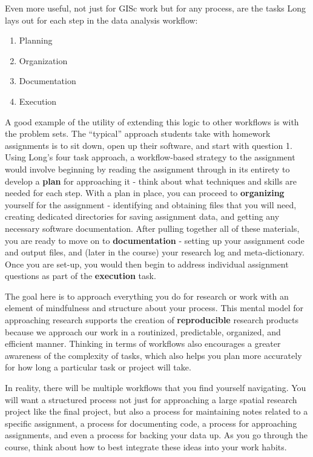 \documentclass[]{book}
\providecommand{\tightlist}{%
  \setlength{\itemsep}{0pt}\setlength{\parskip}{0pt}}
\theoremstyle{definition}
\theoremstyle{definition}
\theoremstyle{remark}
\begin{document}
Even more useful, not just for GISc work but for any process, are the
tasks Long lays out for each step in the data analysis workflow:

\begin{enumerate}
\def\labelenumi{\arabic{enumi}.}
\tightlist
\item
  Planning
\item
  Organization
\item
  Documentation
\item
  Execution
\end{enumerate}

A good example of the utility of extending this logic to other workflows
is with the problem sets. The ``typical'' approach students take with
homework assignments is to sit down, open up their software, and start
with question 1. Using Long's four task approach, a workflow-based
strategy to the assignment would involve beginning by reading the
assignment through in its entirety to develop a \textbf{plan} for
approaching it - think about what techniques and skills are needed for
each step. With a plan in place, you can proceed to \textbf{organizing}
yourself for the assignment - identifying and obtaining files that you
will need, creating dedicated directories for saving assignment data,
and getting any necessary software documentation. After pulling together
all of these materials, you are ready to move on to
\textbf{documentation} - setting up your assignment code and output
files, and (later in the course) your research log and meta-dictionary.
Once you are set-up, you would then begin to address individual
assignment questions as part of the \textbf{execution} task.

The goal here is to approach everything you do for research or work with
an element of mindfulness and structure about your process. This mental
model for approaching research supports the creation of
\textbf{reproducible} research products because we approach our work in
a routinized, predictable, organized, and efficient manner. Thinking in
terms of workflows also encourages a greater awareness of the complexity
of tasks, which also helps you plan more accurately for how long a
particular task or project will take.

In reality, there will be multiple workflows that you find yourself
navigating. You will want a structured process not just for approaching
a large spatial research project like the final project, but also a
process for maintaining notes related to a specific assignment, a
process for documenting code, a process for approaching assignments, and
even a process for backing your data up. As you go through the course,
think about how to best integrate these ideas into your work habits.
\end{document}
